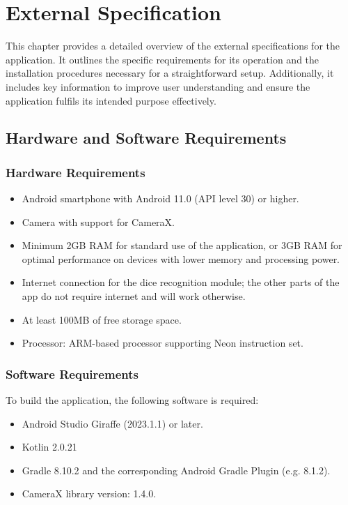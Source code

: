 \chapter{External Specification}

This chapter provides a detailed overview of the external specifications for the application. It outlines the specific requirements for its operation and the installation procedures necessary for a straightforward setup. Additionally, it includes key information to improve user understanding and ensure the application fulfils its intended purpose effectively.

\section{Hardware and Software Requirements}
\subsection{Hardware Requirements}
\begin{itemize}
    \item Android smartphone with Android 11.0 (API level 30) or higher.
    \item Camera with support for CameraX.
     \item Minimum 2GB RAM for standard use of the application, or 3GB RAM for optimal performance on devices with lower memory and processing power.
    \item Internet connection for the dice recognition module; the other parts of the app do not require internet and will work otherwise.
    \item At least 100MB of free storage space.
    \item Processor: ARM-based processor supporting Neon instruction set.
\end{itemize}

\subsection{Software Requirements}
To build the application, the following software is required:
\begin{itemize}
    \item Android Studio Giraffe (2023.1.1) or later.
    \item Kotlin 2.0.21
    \item Gradle 8.10.2 and the corresponding Android Gradle Plugin (e.g. 8.1.2).
    \item CameraX library version: 1.4.0.
\end{itemize}

